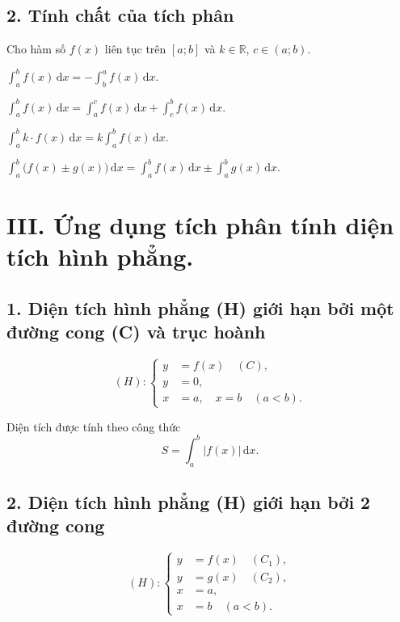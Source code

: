 \documentclass[12pt,a4paper]{article}
\newcommand{\R}{\mathbb{R}}
\newcommand{\dd}{\,\mathrm{d}}
\begin{document}
\subsection*{2. Tính chất của tích phân}

Cho hàm số $f(x)$ liên tục trên $[a;b]$ và $k\in\R$, $c\in(a;b)$.

\begin{flushleft}
\hspace*{0.45cm}$\displaystyle \int_a^b f(x)\dd x=-\int_b^a f(x)\dd x.$\par
\vspace{-2pt}
\hspace*{0.45cm}$\displaystyle \int_a^b f(x)\dd x=\int_a^c f(x)\dd x+\int_c^b f(x)\dd x.$\par
\vspace{-2pt}
\hspace*{0.45cm}$\displaystyle \int_a^b k\cdot f(x)\dd x=k\int_a^b f(x)\dd x.$\par
\vspace{-2pt}
\hspace*{0.45cm}$\displaystyle \int_a^b\bigl(f(x)\pm g(x)\bigr)\dd x
=\int_a^b f(x)\dd x\pm\int_a^b g(x)\dd x.$\par
\end{flushleft}

\section*{III. Ứng dụng tích phân tính diện tích hình phẳng.}

\subsection*{1. Diện tích hình phẳng (H) giới hạn bởi một đường cong (C) và trục hoành}

\[
(H):\left\{
\begin{aligned}
y&=f(x)\quad(C),\\
y&=0,\\
x&=a,\quad x=b\quad(a<b).
\end{aligned}
\right.
\]

Diện tích được tính theo công thức
\[
\boxed{S=\int_a^b|f(x)|\dd x}.
\]

\subsection*{2. Diện tích hình phẳng (H) giới hạn bởi 2 đường cong}

\[
(H):\left\{
\begin{aligned}
y&=f(x)\quad(C_1),\\
y&=g(x)\quad(C_2),\\
x&=a,\\
x&=b\quad(a<b).
\end{aligned}
\right.
\]
\end{document}
